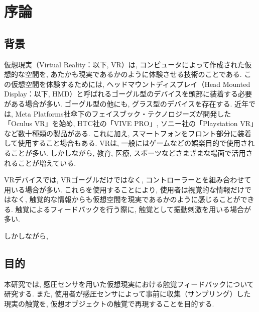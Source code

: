 \chapter{序論}
\thispagestyle{plain}

\section{背景}
仮想現実（Virtual Reality：以下, VR）は, コンピュータによって作成された仮想的な空間を, あたかも現実であるかのように体験させる技術のことである.
この仮想空間を体験するためには, ヘッドマウントディスプレイ（Head Mounted Display：以下, HMD）と呼ばれるゴーグル型のデバイスを頭部に装着する必要がある場合が多い.
ゴーグル型の他にも, グラス型のデバイスを存在する.
近年では, Meta Platforms社傘下のフェイスブック・テクノロジーズが開発した「Oculus VR」を始め, HTC社の「VIVE PRO」, ソニー社の「Playstation VR」など数十種類の製品がある.
これに加え, スマートフォンをフロント部分に装着して使用すること場合もある.
VRは, 一般にはゲームなどの娯楽目的で使用されることが多い.
しかしながら, 教育, 医療, スポーツなどさまざまな場面で活用されることが増えている.

VRデバイスでは, VRゴーグルだけではなく, コントローラーとを組み合わせて用いる場合が多い.
これらを使用することにより, 使用者は視覚的な情報だけではなく, 触覚的な情報からも仮想空間を現実であるかのように感じることができる.
触覚によるフィードバックを行う際に, 触覚として振動刺激を用いる場合が多い.

しかしながら, 

\section{目的}
本研究では, 感圧センサを用いた仮想現実における触覚フィードバックについて研究する.
また, 使用者が感圧センサによって事前に収集（サンプリング）した現実の触覚を, 仮想オブジェクトの触覚で再現することを目的する.


